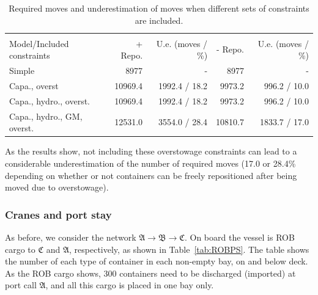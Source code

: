 \begin{table}[width=.9\linewidth,cols=5,pos=htbp]
\caption{Required moves and underestimation of moves when different sets of constraints are included.}\label{tab:resultsOverst}
\begin{tabular*}{\tblwidth}{@{} LRRRR@{}}
\toprule
& \\
Model/Included constraints	& + Repo. & U.e. (moves / \%) & - Repo. & U.e. (moves / \%)\\
\midrule
Simple 						& 8977    & - 			  & 8977 	&  - \\
Capa., overst				& 10969.4 & 1992.4 / 18.2 & 9973.2 	&  996.2 / 10.0\\
Capa., hydro., overst.		& 10969.4 & 1992.4 / 18.2 & 9973.2 	&  996.2 / 10.0\\
Capa., hydro., GM, overst. 	& 12531.0 & 3554.0 / 28.4 & 10810.7 & 1833.7 / 17.0\\
\bottomrule
\end{tabular*}
\end{table}

As the results show, not including these overstowage constraints can lead to a considerable underestimation of the number of required moves (17.0 or 28.4\% depending on whether or not containers can be freely repositioned after being moved due to overstowage).

\subsubsection{Cranes and port stay}
As before, we consider the network $\mathfrak{A} \rightarrow \mathfrak{B} \rightarrow \mathfrak{C}$. On board the vessel is ROB cargo to $\mathfrak{C}$ and $\mathfrak{A}$, respectively, as shown in Table~\ref{tab:ROBPS}. 
The table shows the number of each type of container in each non-empty bay, on and below deck. As the ROB cargo shows, 300 containers need to be discharged (imported) at port call $\mathfrak{A}$, and all this cargo is placed in one bay only.

